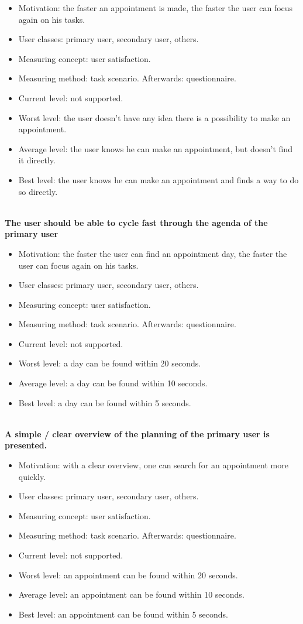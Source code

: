 \documentclass[11pt, a4paper,svglistings]{report}
\begin{document}
\begin{itemize}
\item{Motivation: the faster an appointment is made, the faster the user can focus again on his tasks.}
\item{User classes: primary user, secondary user, others.}
\item{Measuring concept: user satisfaction.}
\item{Measuring method: task scenario. Afterwards: questionnaire.}
\item{Current level: not supported.}
\item{Worst level: the user doesn't have any idea there is a possibility to make an appointment.}
\item{Average level: the user knows he can make an appointment, but doesn't find it directly.}
\item{Best level: the user knows he can make an appointment and finds a way to do so directly. \\ \\}
\end{itemize}
\textbf{The user should be able to cycle fast through the agenda of the primary user}
\begin{itemize}
\item{Motivation: the faster the user can find an appointment day, the faster the user can focus again on his tasks.}
\item{User classes: primary user, secondary user, others.}
\item{Measuring concept: user satisfaction.}
\item{Measuring method: task scenario. Afterwards: questionnaire.}
\item{Current level: not supported.}
\item{Worst level: a day can be found within 20 seconds.}
\item{Average level: a day can be found within 10 seconds.}
\item{Best level: a day can be found within 5 seconds. \\ \\}
\end{itemize}
\textbf{A simple / clear overview of the planning of the primary user is presented.}
\begin{itemize}
\item{Motivation: with a clear overview, one can search for an appointment more quickly.}
\item{User classes: primary user, secondary user, others.}
\item{Measuring concept: user satisfaction.}
\item{Measuring method: task scenario. Afterwards: questionnaire.}
\item{Current level: not supported.}
\item{Worst level: an appointment can be found within 20 seconds.}
\item{Average level: an appointment can be found within 10 seconds.}
\item{Best level: an appointment can be found within 5 seconds. \\ \\}
\end{itemize}
\end{document}
